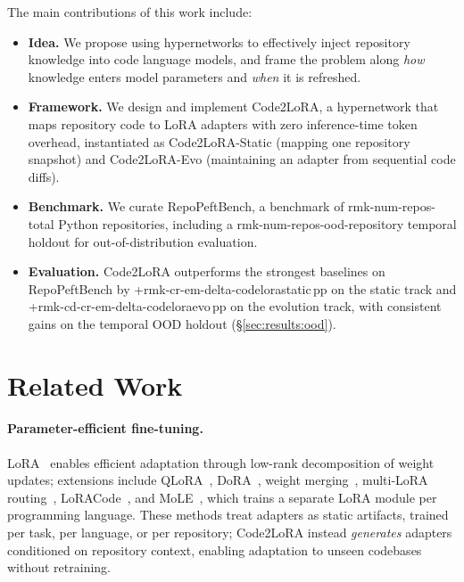 \documentclass{llmxive}
\providecommand{\UseMacro}[1]{\csname rmk-#1\endcsname}
\providecommand{\codelora}{Code2LoRA\xspace}
\providecommand{\repopeftbench}{RepoPeftBench\xspace}
\providecommand{\codelorastatic}{\codelora-Static\xspace}
\providecommand{\codeloraevo}{\codelora-Evo\xspace}
\begin{document}
\vspace{3pt}
\noindent
The main contributions of this work include:

\begin{itemize}[topsep=3pt,itemsep=1ex,partopsep=0ex,parsep=0ex,leftmargin=*]
\item \textbf{Idea.}
We propose using hypernetworks to effectively inject repository knowledge into code language models, and frame the problem along \emph{how} knowledge enters model parameters and \emph{when} it is refreshed.
\item \textbf{Framework.}
We design and implement \codelora{}, a hypernetwork that maps repository code to LoRA adapters with zero inference-time token overhead, instantiated as \codelorastatic{} (mapping one repository snapshot) and \codeloraevo{} (maintaining an adapter from sequential code diffs).
\item \textbf{Benchmark.}
We curate \repopeftbench{}, a benchmark of \UseMacro{num-repos-total} Python repositories, including a \UseMacro{num-repos-ood}-repository temporal holdout for out-of-distribution evaluation.
\item \textbf{Evaluation.}
\codelora{} outperforms the strongest baselines on \repopeftbench{} by +\UseMacro{cr-em-delta-codelorastatic}\,pp on the static track and +\UseMacro{cd-cr-em-delta-codeloraevo}\,pp on the evolution track, with consistent gains on the temporal OOD holdout (\S\ref{sec:results:ood}).
\end{itemize}




\section{Related Work}
\label{sec:related}

\paragraph{Parameter-efficient fine-tuning.}
LoRA~\cite{hu2022lora} enables efficient adaptation through low-rank decomposition of weight updates; extensions include QLoRA~\cite{dettmers2023qlora}, DoRA~\cite{liu2024dora}, weight merging~\cite{yadav2024ties}, multi-LoRA routing~\cite{huang2024lorahub}, LoRACode~\cite{chaturvedi2025loracodeloraadapterscode}, and MoLE~\cite{zong2025mixlanguageexperts}, which trains a separate LoRA module per programming language.
These methods treat adapters as static artifacts, trained per task, per language, or per repository; \codelora{} instead \emph{generates} adapters conditioned on repository context, enabling adaptation to unseen codebases without retraining.
\end{document}
